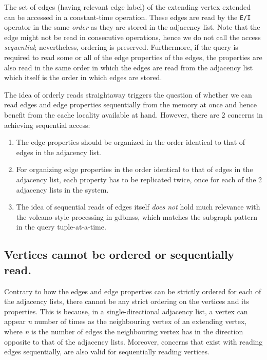 \label{ssec:edges-ordered}
\begin{guideline}
The set of edges (having relevant edge label) of the extending vertex extended can be accessed in a constant-time operation. These edges are read by the \texttt{E/I} operator in the same \emph{order} as they are stored in the adjacency list. Note that the edge might not be read in consecutive operations, hence we do not call the access \emph{sequential}; nevertheless, ordering is preserved. Furthermore, if the query is required to read some or all of the edge properties of the edges, the properties are also read in the same order in which the edges are read from the adjacency list which itself is the order in which edges are stored.

The idea of orderly reads straightaway triggers the question of whether we can read edges and edge properties sequentially from the memory at once and hence benefit from the cache locality available at hand. However, there are 2 concerns in achieving sequential access: 

\begin{enumerate}
	
	\item The edge properties should be organized in the order identical to that of edges in the adjacency list.
	
	\item For organizing edge properties in the order identical to that of edges in the adjacency list, each property has to be replicated twice, once for each of the 2 adjacency lists in the system.
	
	\item The idea of sequential reads of edges itself \emph{does not} hold much relevance with the volcano-style processing in \gls{gdbms}s, which matches the subgraph pattern in the query tuple-at-a-time.
	
\end{enumerate}

\end{guideline}

\subsection{Vertices cannot be ordered or sequentially read.}
\label{gdln:vertices-unordered}

Contrary to how the edges and edge properties can be strictly ordered for each of the adjacency lists, there cannot be any strict ordering on the vertices and its properties. This is because, in a single-directional adjacency list, a vertex can appear \textit{n} number of times as the neighbouring vertex of an extending vertex, where \textit{n} is the number of edges the neighbouring vertex has in the direction opposite to that of the adjacency lists. Moreover, concerns that exist with reading edges sequentially, are also valid for sequentially reading vertices.


